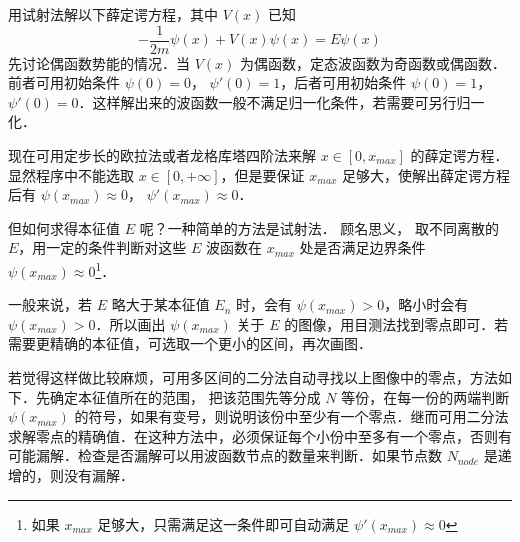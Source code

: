 
用试射法解以下薛定谔方程，其中 $V(x)$ 已知
\begin{equation}
-\frac{1}{2m}\psi(x) + V(x)\psi(x) = E \psi(x)
\end{equation}
先讨论偶函数势能的情况．当 $V(x)$ 为偶函数，定态波函数为奇函数或偶函数．前者可用初始条件 $\psi(0)=0$， $\psi'(0)=1$，后者可用初始条件 $\psi(0)=1$， $\psi'(0)=0$．这样解出来的波函数一般不满足归一化条件，若需要可另行归一化．

现在可用定步长的欧拉法或者龙格库塔四阶法来解 $x\in [0, x_{max}]$ 的薛定谔方程．显然程序中不能选取 $x\in [0,+\infty]$，但是要保证 $x_{max}$ 足够大，使解出薛定谔方程后有 $\psi(x_{max})\approx 0$， $\psi'(x_{max})\approx 0$．

但如何求得本征值 $E$ 呢？一种简单的方法是试射法． 顾名思义， 取不同离散的 $E$，用一定的条件判断对这些 $E$ 波函数在 $x_{max}$ 处是否满足边界条件 $\psi(x_{max}) \approx 0$\footnote{如果 $x_{max}$ 足够大，只需满足这一条件即可自动满足 $\psi'(x_{max})\approx 0$}．

一般来说，若 $E$ 略大于某本征值 $E_n$ 时，会有 $\psi(x_{max})>0$，略小时会有 $\psi(x_{max})>0$．所以画出 $\psi(x_{max})$ 关于 $E$ 的图像，用目测法找到零点即可．若需要更精确的本征值，可选取一个更小的区间，再次画图．

若觉得这样做比较麻烦，可用多区间的二分法自动寻找以上图像中的零点，方法如下．先确定本征值所在的范围， 把该范围先等分成 $N$ 等份，在每一份的两端判断 $\psi(x_{max})$ 的符号，如果有变号，则说明该份中至少有一个零点．继而可用二分法求解零点的精确值．在这种方法中，必须保证每个小份中至多有一个零点，否则有可能漏解．检查是否漏解可以用波函数节点的数量来判断．如果节点数 $N_{node}$ 是递增的，则没有漏解．